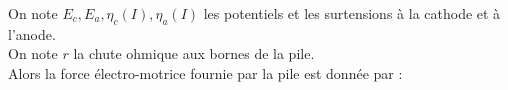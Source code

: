 \documentclass[a4paper]{article}
\begin{document}
\pagestyle{fancy}
\fancyhf{}
\setlength{\headheight}{15pt}

\begin{center}
	\large{}
\end{center}


On note \(E_c,E_a,\eta_c(I),\eta_a(I)\) les potentiels et les surtensions à la cathode et à l'anode.\\
On note \(r\) la chute ohmique aux bornes de la pile.\\
Alors la force électro-motrice fournie par la pile est donnée par :\begin{center}\end{center}
\end{document}
